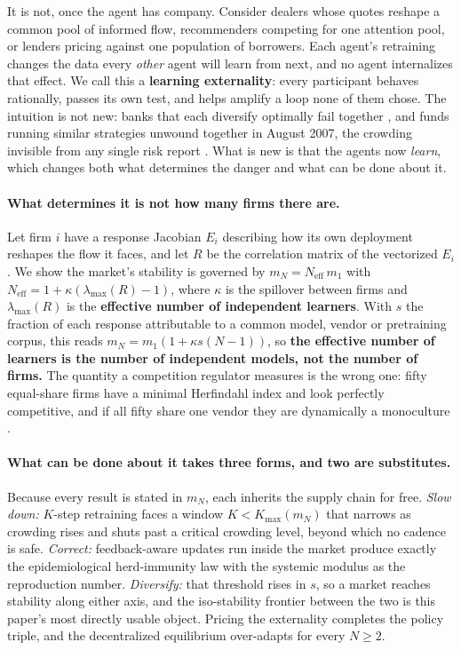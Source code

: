 \documentclass{article}
\theoremstyle{plain}
\theoremstyle{definition}
\newcommand{\Neff}{N_{\mathrm{eff}}}
\newcommand{\mN}{m_N}
\newcommand{\lmax}{\lambda_{\max}}
\begin{document}
It is not, once the agent has company. Consider dealers whose quotes reshape a common pool of informed flow, recommenders competing for one attention pool, or lenders pricing against one population of borrowers. Each agent's retraining changes the data every \emph{other} agent will learn from next, and no agent internalizes that effect. We call this a \textbf{learning externality}: every participant behaves rationally, passes its own test, and helps amplify a loop none of them chose. The intuition is not new: banks that each diversify optimally fail together \citep{beale2011,wagner2010}, and funds running similar strategies unwound together in August 2007, the crowding invisible from any single risk report \citep{khandani2007}. What is new is that the agents now \emph{learn}, which changes both what determines the danger and what can be done about it.

\paragraph{What determines it is not how many firms there are.}
Let firm $i$ have a response Jacobian $E_i$ describing how its own deployment reshapes the flow it faces, and let $R$ be the correlation matrix of the vectorized $E_i$. We show the market's stability is governed by $\mN = \Neff\, m_1$ with $\Neff = 1 + \kappa(\lmax(R)-1)$, where $\kappa$ is the spillover between firms and $\lmax(R)$ is the \textbf{effective number of independent learners}. With $s$ the fraction of each response attributable to a common model, vendor or pretraining corpus, this reads $\mN = m_1(1 + \kappa s (N-1))$, so \textbf{the effective number of learners is the number of independent models, not the number of firms.} The quantity a competition regulator measures is the wrong one: fifty equal-share firms have a minimal Herfindahl index and look perfectly competitive, and if all fifty share one vendor they are dynamically a monoculture \citep{hirschman1964}.

\paragraph{What can be done about it takes three forms, and two are substitutes.}
Because every result is stated in $\mN$, each inherits the supply chain for free. \emph{Slow down:} $K$-step retraining faces a window $K < K_{\max}(\mN)$ that narrows as crowding rises and shuts past a critical crowding level, beyond which no cadence is safe. \emph{Correct:} feedback-aware updates \citep{izzo2021} run inside the market produce exactly the epidemiological herd-immunity law with the systemic modulus as the reproduction number. \emph{Diversify:} that threshold rises in $s$, so a market reaches stability along either axis, and the iso-stability frontier between the two is this paper's most directly usable object. Pricing the externality completes the policy triple, and the decentralized equilibrium over-adapts for every $N \geq 2$.
\end{document}
